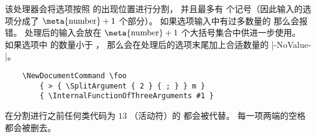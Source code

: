 \documentclass{l3doc}
\begin{document}
\begin{function}[updated = 2012-02-12]{\SplitArgument}
\begin{syntax}
      
\end{syntax}
该处理器会将选项按照  的出现位置进行分割，
并且最多有  个记号（因此输入的选项分成了 $\text{\meta{number}} + 1$ 个部分）。
如果选项输入中有过多数量的  那么会报错。
处理后的输入会放在 $\text{\meta{number}} + 1$ 个大括号集合中供进一步使用。
如果选项中  的数量小于 ，
那么会在处理后的选项末尾加上合适数量的 |-NoValue-|。
\begin{verbatim}
    \NewDocumentCommand \foo
        { > { \SplitArgument { 2 } { ; } } m }
        { \InternalFunctionOfThreeArguments #1 }
\end{verbatim}
在分割进行之前任何类代码为 $13$ （活动符）的  都会被代替。
每一项两端的空格都会被删去。
%
\end{function}
\end{document}
